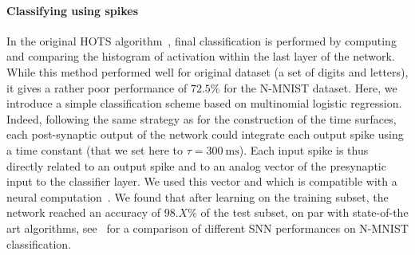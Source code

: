 \documentclass[12pt]{article}
\newcommand{\citep}[1]{\parencite{#1}}
\newcommand{\citet}[1]{\textcite{#1}}
\newcommand{\ms}{\si{\milli\second}}%
\begin{document}
\paragraph*{Classifying using spikes}
In the original HOTS algorithm~\citet{Lagorce17}, final classification is performed by computing and comparing the histogram of activation within the last layer of the network. %
While this method performed well for original dataset (a set of digits and letters), it gives a rather poor performance of $72.5\%$ for the N-MNIST dataset.
Here, we introduce a simple classification scheme based on multinomial logistic regression.
Indeed, following the same strategy as for the construction of the time surfaces, each post-synaptic output of the network could integrate each output spike using a time constant (that we set here to $\tau=300~\ms$). Each input spike is thus directly related to an output spike and to an analog vector of the presynaptic input to the classifier layer. We used this vector and which is compatible with a neural computation~\citep{Berens12}. We found that after learning on the training subset, the network reached an accuracy of $98.X\%$ of the test subset, on par with state-of-the art algorithms, see~\citet{He20} for a comparison of different SNN performances on N-MNIST classification.
%
\end{document}
